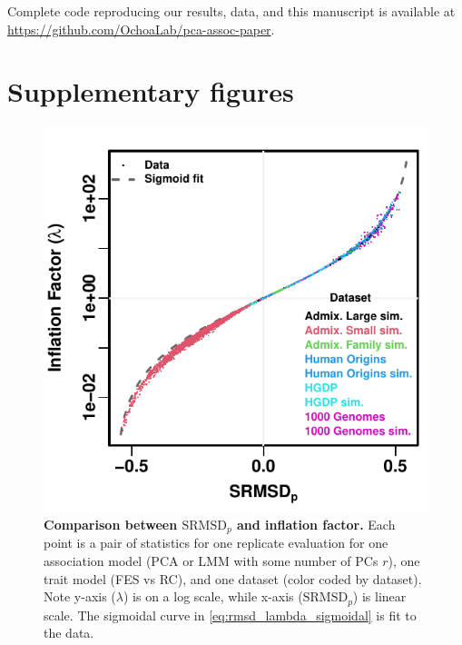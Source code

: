 \documentclass[11pt]{article}
\newcommand{\rmsd}{\text{SRMSD}_p}
\newcommand{\beginsupplement}{%
  \setcounter{table}{0}
  \renewcommand{\thetable}{S\arabic{table}}%
  \setcounter{figure}{0}
  \renewcommand{\thefigure}{S\arabic{figure}}%
  \setcounter{section}{0}
  \renewcommand{\thesection}{S\arabic{section}}%
  \setcounter{equation}{0}
  \renewcommand{\theequation}{S\arabic{equation}}%
  \setcounter{page}{1}
  \renewcommand{\thepage}{S\arabic{page}}%
}
\begin{document}
Complete code reproducing our results, data, and this manuscript is available at \url{https://github.com/OchoaLab/pca-assoc-paper}.


\printbibliography


\clearpage

\beginsupplement

\section{Supplementary figures}

\begin{figure}[bp!]
  \centering
  \includegraphics{sum-rmsd-vs-lambda.pdf}
  \caption{
    {\bf Comparison between $\rmsd$ and inflation factor.}
    Each point is a pair of statistics for one replicate evaluation for one association model (PCA or LMM with some number of PCs $r$), one trait model (FES vs RC), and one dataset (color coded by dataset).
    Note y-axis ($\lambda$) is on a log scale, while x-axis ($\rmsd$) is linear scale.
    The sigmoidal curve in \cref{eq:rmsd_lambda_sigmoidal} is fit to the data.
  }
  \label{fig:rmsd_lambda}
\end{figure}
\end{document}
